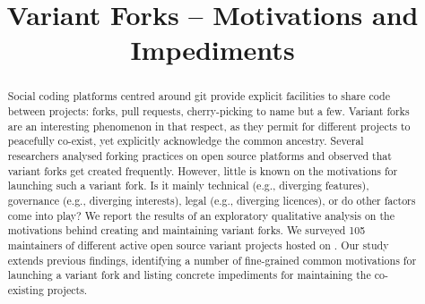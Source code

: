 

\pagestyle{fancy}
\fancyhead[r]{\thepage}




\title{Variant Forks -- Motivations and Impediments}

\author{
	}




\maketitle

\begin{abstract}
Social coding platforms centred around git provide explicit facilities to share code between projects: forks, pull requests, cherry-picking to name but a few.
Variant forks are an interesting phenomenon in that respect, as they permit for different projects to peacefully co-exist, yet explicitly acknowledge the common ancestry.
Several researchers analysed forking practices on open source platforms and observed that variant forks get created frequently.
However, %
little is known on the motivations for launching such a variant fork.
Is it mainly technical (e.g., diverging features), governance (e.g., diverging interests), legal (e.g., diverging licences), or do other factors come into play?
We report the results of an exploratory qualitative analysis on the motivations behind creating and maintaining variant forks.
We surveyed 105 maintainers of different active open source variant projects hosted on \gh.
Our study extends previous findings, identifying a number of fine-grained common motivations for launching a variant fork and listing concrete impediments for maintaining the co-existing projects.
\end{abstract}

